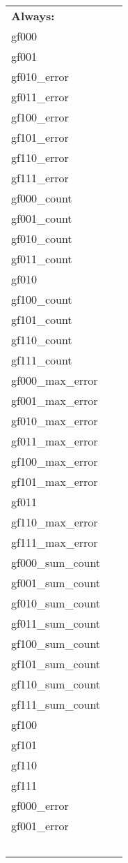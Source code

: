  \begin{tabular*}{160mm}{ll} 

{\bf Always:}&  ~ \\ 
 gf000 & ~\\ 
 gf001 & ~\\ 
 gf010\_error & ~\\ 
 gf011\_error & ~\\ 
 gf100\_error & ~\\ 
 gf101\_error & ~\\ 
 gf110\_error & ~\\ 
 gf111\_error & ~\\ 
 gf000\_count & ~\\ 
 gf001\_count & ~\\ 
 gf010\_count & ~\\ 
 gf011\_count & ~\\ 
 gf010 & ~\\ 
 gf100\_count & ~\\ 
 gf101\_count & ~\\ 
 gf110\_count & ~\\ 
 gf111\_count & ~\\ 
 gf000\_max\_error & ~\\ 
 gf001\_max\_error & ~\\ 
 gf010\_max\_error & ~\\ 
 gf011\_max\_error & ~\\ 
 gf100\_max\_error & ~\\ 
 gf101\_max\_error & ~\\ 
 gf011 & ~\\ 
 gf110\_max\_error & ~\\ 
 gf111\_max\_error & ~\\ 
 gf000\_sum\_count & ~\\ 
 gf001\_sum\_count & ~\\ 
 gf010\_sum\_count & ~\\ 
 gf011\_sum\_count & ~\\ 
 gf100\_sum\_count & ~\\ 
 gf101\_sum\_count & ~\\ 
 gf110\_sum\_count & ~\\ 
 gf111\_sum\_count & ~\\ 
 gf100 & ~\\ 
 gf101 & ~\\ 
 gf110 & ~\\ 
 gf111 & ~\\ 
 gf000\_error & ~\\ 
 gf001\_error & ~\\ 
~ & ~\\ 
\end{tabular*} 


